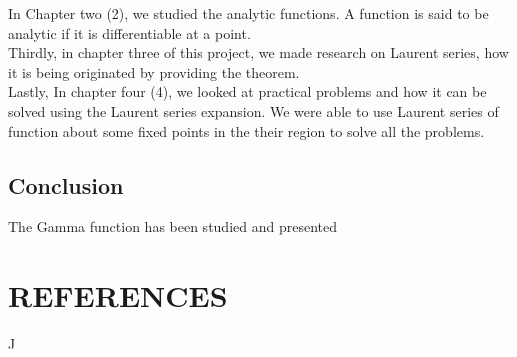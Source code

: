 \documentclass[11pt]{report}
\newcommand{\NI}{\noindent}
\begin{document}
	\NI In Chapter two (2), we studied the analytic functions. A function is said to be analytic if it is differentiable at a point.\\
	
	\NI Thirdly, in chapter three of this project, we made research on Laurent series, how it is being originated by providing the theorem.\\
	
	\NI Lastly, In chapter four (4), we looked at practical problems and how it can be solved using the Laurent series expansion. We were able to use Laurent series of function about some fixed points in the their region to solve all the problems.
	\section{Conclusion}
	The Gamma function has been studied and presented 
	

	
	\chapter*{REFERENCES}
	
	\begin{description}
		\item J
		
	\end{description}
	
\end{document}
